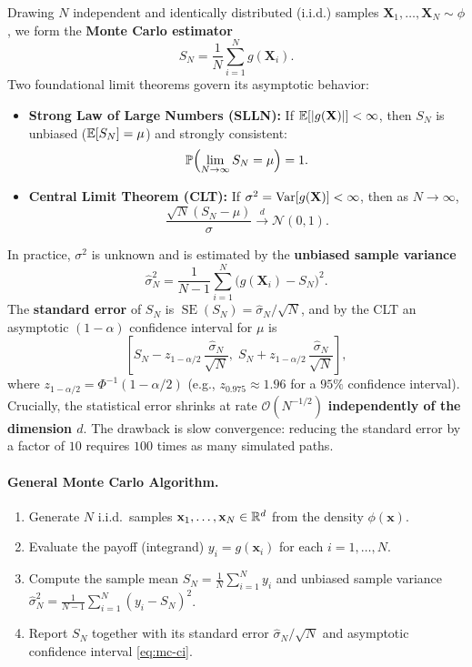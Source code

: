 Drawing $N$ independent and identically distributed (i.i.d.) samples $\mathbf{X}_1, \ldots, \mathbf{X}_N \sim \phi$, we form the \textbf{Monte Carlo estimator}
\begin{equation}\label{eq:mc-estimator}
S_N = \frac{1}{N}\sum_{i=1}^N g(\mathbf{X}_i).
\end{equation}
Two foundational limit theorems govern its asymptotic behavior:
\begin{itemize}
    \item \textbf{Strong Law of Large Numbers (SLLN):} If $\mathbb{E}[|g(\mathbf{X})|] < \infty$, then $S_N$ is unbiased ($\mathbb{E}[S_N] = \mu$) and strongly consistent:
    \[
    \mathbb{P}\!\left(\lim_{N \to \infty} S_N = \mu\right) = 1.
    \]
    \item \textbf{Central Limit Theorem (CLT):} If $\sigma^2 = \operatorname{Var}[g(\mathbf{X})] < \infty$, then as $N \to \infty$,
    \[
    \frac{\sqrt{N}(S_N - \mu)}{\sigma} \xrightarrow{\;d\;} \mathcal{N}(0, 1).
    \]
\end{itemize}

In practice, $\sigma^2$ is unknown and is estimated by the \textbf{unbiased sample variance}
\[
\hat{\sigma}_N^2 = \frac{1}{N - 1}\sum_{i=1}^N \bigl(g(\mathbf{X}_i) - S_N\bigr)^2.
\]
The \textbf{standard error} of $S_N$ is $\operatorname{SE}(S_N) = \hat{\sigma}_N / \sqrt{N}$, and by the CLT an asymptotic $(1 - \alpha)$ confidence interval for $\mu$ is
\begin{equation}\label{eq:mc-ci}
\left[S_N - z_{1-\alpha/2}\,\frac{\hat{\sigma}_N}{\sqrt{N}},\; S_N + z_{1-\alpha/2}\,\frac{\hat{\sigma}_N}{\sqrt{N}}\right],
\end{equation}
where $z_{1-\alpha/2} = \Phi^{-1}(1 - \alpha/2)$ (e.g., $z_{0.975} \approx 1.96$ for a $95\%$ confidence interval). Crucially, the statistical error shrinks at rate $\mathcal{O}(N^{-1/2})$ \textbf{independently of the dimension $d$}. The drawback is slow convergence: reducing the standard error by a factor of $10$ requires $100$ times as many simulated paths.

\paragraph{General Monte Carlo Algorithm.}
\begin{enumerate}
    \item Generate $N$ i.i.d.\ samples $\mathbf{x}_1, \ldots, \mathbf{x}_N \in \mathbb{R}^d$ from the density $\phi(\mathbf{x})$.
    \item Evaluate the payoff (integrand) $y_i = g(\mathbf{x}_i)$ for each $i = 1, \ldots, N$.
    \item Compute the sample mean $S_N = \frac{1}{N}\sum_{i=1}^N y_i$ and unbiased sample variance $\hat{\sigma}_N^2 = \frac{1}{N-1}\sum_{i=1}^N (y_i - S_N)^2$.
    \item Report $S_N$ together with its standard error $\hat{\sigma}_N/\sqrt{N}$ and asymptotic confidence interval \eqref{eq:mc-ci}.
\end{enumerate}

